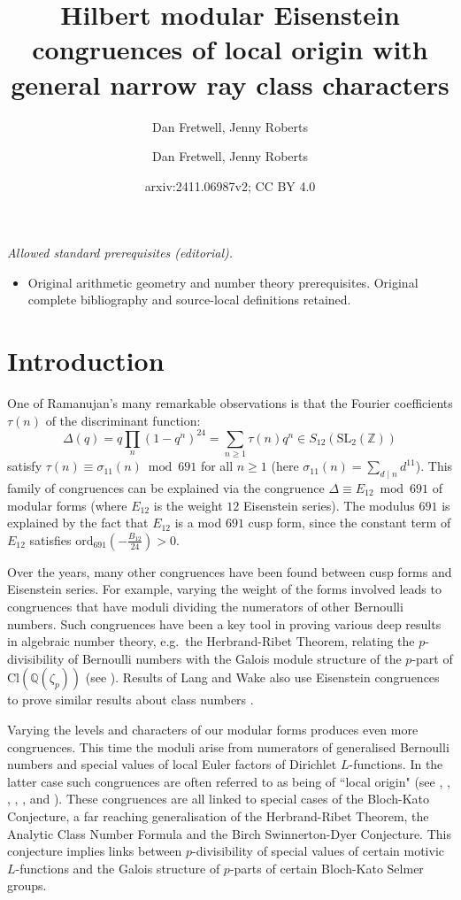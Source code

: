 \documentclass[a4paper,oneside]{amsart}
\date{}
\author{Dan Fretwell, Jenny Roberts}
\title{Hilbert modular Eisenstein congruences of local origin with general narrow ray class characters}
\author{Dan Fretwell, Jenny Roberts}
\date{arxiv:2411.06987v2; CC BY 4.0}
\theoremstyle{plain}
\theoremstyle{definition}
\begin{document}
\maketitle
\noindent\textit{Allowed standard prerequisites (editorial).}\begin{itemize}
\item Original arithmetic geometry and number theory prerequisites. Original complete bibliography and source-local definitions retained.
\end{itemize}\medskip
\section{Introduction}

One of Ramanujan's many remarkable observations is that the Fourier coefficients $\tau(n)$ of the discriminant function: \[\Delta(q) = q\prod_n(1-q^n)^{24} = \sum_{n\geq 1}\tau(n)q^n \in S_{12}(\text{SL}_2(\mathbb{Z}))\] satisfy $\tau(n)\equiv \sigma_{11}(n) \bmod 691$ for all $n\geq 1$ (here $\sigma_{11}(n) = \sum_{d\mid n}d^{11}$). This family of congruences can be explained via the congruence $\Delta \equiv E_{12} \bmod 691$ of modular forms (where $E_{12}$ is the weight $12$ Eisenstein series). The modulus $691$ is explained by the fact that $E_{12}$ is a mod $691$ cusp form, since the constant term of $E_{12}$ satisfies $\text{ord}_{691}\left(-\frac{B_{12}}{24}\right) > 0$.

Over the years, many other congruences have been found between cusp forms and Eisenstein series. For example, varying the weight of the forms involved leads to congruences that have moduli dividing the numerators of other Bernoulli numbers. Such congruences have been a key tool in proving various deep results in algebraic number theory, e.g.\ the Herbrand-Ribet Theorem, relating the $p$-divisibility of Bernoulli numbers with the Galois module structure of the $p$-part of $\text{Cl}(\mathbb{Q}(\zeta_p))$ (see \cite{ribet}). Results of Lang and Wake also use Eisenstein congruences to prove similar results about class numbers \cite{langwake}.

Varying the levels and characters of our modular forms produces even more congruences. This time the moduli arise from numerators of generalised Bernoulli numbers and special values of local Euler factors of Dirichlet $L$-functions. In the latter case such congruences are often referred to as being of ``local origin" (see \cite{mazur}, \cite{dummigan}, \cite{dummiganfretwell}, \cite{billereymenares}, \cite{billereymenares2}, \cite{spencer} and \cite{fretwellroberts}). These congruences are all linked to special cases of the Bloch-Kato Conjecture, a far reaching generalisation of the Herbrand-Ribet Theorem, the Analytic Class Number Formula and the Birch Swinnerton-Dyer Conjecture. This conjecture implies links between $p$-divisibility of special values of certain motivic $L$-functions and the Galois structure of $p$-parts of certain Bloch-Kato Selmer groups.
\end{document}
